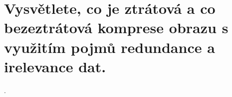 \section{Vysvětlete, co je ztrátová a co bezeztrátová komprese obrazu s využitím pojmů redundance a irelevance dat.}.